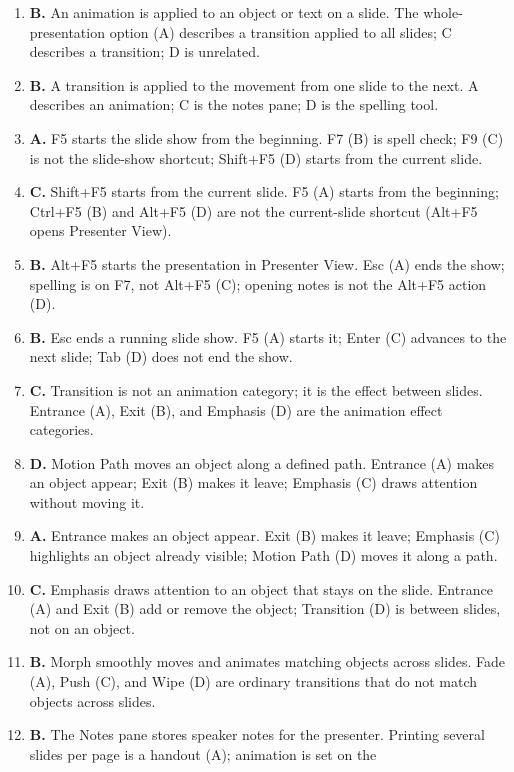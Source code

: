 \begin{enumerate}[label=\textbf{Q\arabic*.}, leftmargin=*]
\item \textbf{B.} An animation is applied to an object or text on a slide. The
  whole-presentation option (A) describes a transition applied to all slides;
  C describes a transition; D is unrelated.
\item \textbf{B.} A transition is applied to the movement from one slide to the
  next. A describes an animation; C is the notes pane; D is the spelling tool.
\item \textbf{A.} F5 starts the slide show from the beginning. F7 (B) is spell
  check; F9 (C) is not the slide-show shortcut; Shift+F5 (D) starts from the
  current slide.
\item \textbf{C.} Shift+F5 starts from the current slide. F5 (A) starts from
  the beginning; Ctrl+F5 (B) and Alt+F5 (D) are not the current-slide shortcut
  (Alt+F5 opens Presenter View).
\item \textbf{B.} Alt+F5 starts the presentation in Presenter View. Esc (A)
  ends the show; spelling is on F7, not Alt+F5 (C); opening notes is not the
  Alt+F5 action (D).
\item \textbf{B.} Esc ends a running slide show. F5 (A) starts it; Enter (C)
  advances to the next slide; Tab (D) does not end the show.
\item \textbf{C.} Transition is not an animation category; it is the effect
  between slides. Entrance (A), Exit (B), and Emphasis (D) are the animation
  effect categories.
\item \textbf{D.} Motion Path moves an object along a defined path. Entrance
  (A) makes an object appear; Exit (B) makes it leave; Emphasis (C) draws
  attention without moving it.
\item \textbf{A.} Entrance makes an object appear. Exit (B) makes it leave;
  Emphasis (C) highlights an object already visible; Motion Path (D) moves it
  along a path.
\item \textbf{C.} Emphasis draws attention to an object that stays on the
  slide. Entrance (A) and Exit (B) add or remove the object; Transition (D) is
  between slides, not on an object.
\item \textbf{B.} Morph smoothly moves and animates matching objects across
  slides. Fade (A), Push (C), and Wipe (D) are ordinary transitions that do not
  match objects across slides.
\item \textbf{B.} The Notes pane stores speaker notes for the presenter.
  Printing several slides per page is a handout (A); animation is set on the

\end{enumerate}
